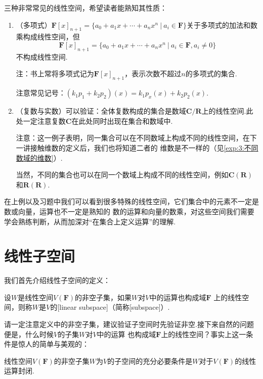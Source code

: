 \begin{example}
    三种非常常见的线性空间，希望读者能熟知其性质：
    \begin{enumerate}
        \item （多项式）$\mathbf{F}[x]_{n+1}=\{a_0+a_1x+\cdots+a_nx^n\ |\ a_i\in\mathbf{F}\}$关于多项式的加法和数乘构成线性空间，但
        \[\mathbf{F}[x]_{n+1}=\{a_0+a_1x+\cdots+a_nx^n\ |\ a_i\in\mathbf{F},a_i\neq 0\}\]
        不构成线性空间.

        注：书上常将多项式记为$\mathbf{F}[x]_{n+1}$，表示次数不超过$n$的多项式的集合.

        注意常见记号：$(k_1p_1+k_2p_2)(x)=k_1p_x(x)+k_2p_2(x)$.
        \item （复数与实数）可以验证：全体复数构成的集合是数域$\mathbf{C}/\mathbf{R}$上的线性空间.此处一定注意复数$\mathbf{C}$在此处同时出现在集合和数域中.

        注意：这一例子表明，同一集合可以在不同数域上构成不同的线性空间，在下一讲接触维数的定义后，我们也将知道二者的
        维数是不一样的（见\autoref{exp:3:不同数域的维数}）.
        
        当然，不同的集合也可以在同一个数域上构成不同的线性空间，例如$\mathbf{C(R)}$和$\mathbf{R(R)}$.
    \end{enumerate}
\end{example}

在上例以及习题中我们可以看到很多特殊的线性空间，它们集合中的元素不一定是数或向量，运算也不一定是熟知的
数的运算和向量的数乘，对这些空间我们需要学会熟练判断，从而加深对``在集合上定义运算''的理解.

\section{线性子空间}
我们首先介绍线性子空间的定义：
\begin{definition}
    设$W$是线性空间$V(\mathbf{F})$的非空子集，如果$W$对$V$中的运算也构成域$\mathbf{F}$
    上的线性空间，则称$W$是$V$的[linear subspace]（简称[subspace]）.
\end{definition}

请一定注意定义中的非空子集，建议验证子空间时先验证非空.接下来自然的问题便是，什么时候$V$的子集$W$对$V$中的运算
也构成域$\mathbf{F}$上的线性空间？事实上这一条件是惊人的简单与美观的：
\begin{theorem}\label{thm:2:子空间判别}
    线性空间$V(\mathbf{F})$的非空子集$W$为$V$的子空间的充分必要条件是$W$对于$V(\mathbf{F})$的线性运算封闭.
\end{theorem}

